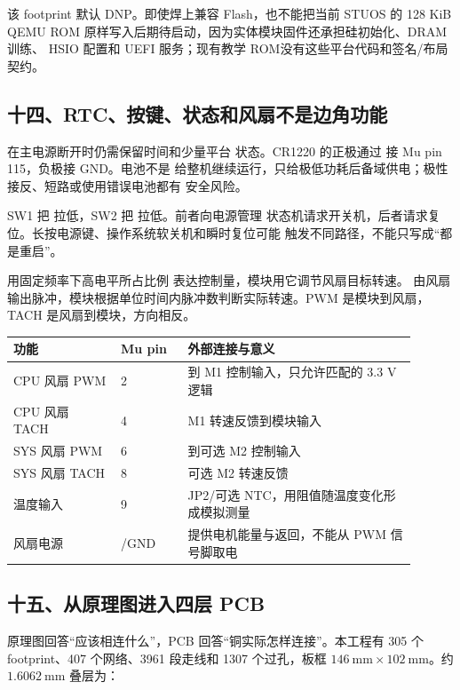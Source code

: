 该 footprint 默认 DNP。即使焊上兼容 Flash，也不能把当前 STUOS 的 128 KiB
QEMU ROM 原样写入后期待启动，因为实体模块固件还承担硅初始化、DRAM 训练、
HSIO 配置和 UEFI 服务；现有教学 ROM没有这些平台代码和签名/布局契约。

\subsection{十四、RTC、按键、状态和风扇不是边角功能}


在主电源断开时仍需保留时间和少量平台
状态。CR1220 的正极通过  接 Mu pin 115，负极接 GND。电池不是
给整机继续运行，只给极低功耗后备域供电；极性接反、短路或使用错误电池都有
安全风险。

SW1 把  拉低，SW2 把  拉低。前者向电源管理
状态机请求开关机，后者请求复位。长按电源键、操作系统软关机和瞬时复位可能
触发不同路径，不能只写成“都是重启”。

用固定频率下高电平所占比例
表达控制量，模块用它调节风扇目标转速。
由风扇输出脉冲，模块根据单位时间内脉冲数判断实际转速。PWM 是模块到风扇，
TACH 是风扇到模块，方向相反。

\begin{longtable}{L{0.24\linewidth}L{0.15\linewidth}L{0.51\linewidth}}
\toprule
功能 & Mu pin & 外部连接与意义 \\
\midrule
CPU 风扇 PWM & 2 & 到 M1 控制输入，只允许匹配的 3.3 V 逻辑 \\
CPU 风扇 TACH & 4 & M1 转速反馈到模块输入 \\
SYS 风扇 PWM & 6 & 到可选 M2 控制输入 \\
SYS 风扇 TACH & 8 & 可选 M2 转速反馈 \\
温度输入 & 9 & JP2/可选 NTC，用阻值随温度变化形成模拟测量 \\
风扇电源 & /GND & 提供电机能量与返回，不能从 PWM 信号脚取电 \\
\bottomrule
\end{longtable}

\subsection{十五、从原理图进入四层 PCB}

原理图回答“应该相连什么”，PCB 回答“铜实际怎样连接”。本工程有 305 个
footprint、407 个网络、3961 段走线和 1307 个过孔，板框
\(146\ \mathrm{mm}\times102\ \mathrm{mm}\)。约 \(1.6062\ \mathrm{mm}\)
叠层为：

